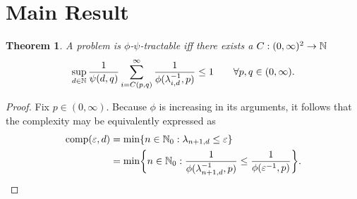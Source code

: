 \documentclass{article}
\newtheorem{theorem}{Theorem}
\theoremstyle{definition}
\begin{document}
\section{Main Result}
\begin{theorem} A problem is $\phi$-$\psi$-tractable iff there exists a  $C : (0,\infty)^2 \to \mathbb{N}$
\begin{equation} \label{eq:tractiff}
    \sup_{d \in \mathbb{N}} \frac{1}{\psi(d,q)} \sum_{i = C(p,q)}^\infty \frac{1}{\phi(\lambda_{i, d}^{-1},p)} \le 1 \qquad \forall p,q \in (0,\infty).
\end{equation}
\end{theorem}
\begin{proof}
Fix $p \in (0,\infty)$.  Because $\phi$ is increasing in its arguments, it follows that the complexity may be equivalently expressed as 
\begin{align*}
    \operatorname{comp}(\varepsilon, d) &= \min \{n \in \mathbb{N}_{0} : \lambda_{n+1, d} \le \varepsilon\} \\
    &= \min \biggl\{n \in \mathbb{N}_{0} : \frac{1}{\phi(\lambda_{n+1, d}^{-1},p)} \le \frac{1}{\phi(\varepsilon^{-1},p)} \biggr\}.
\end{align*}


\end{proof}
\end{document}
